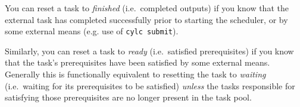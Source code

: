 You can reset a task to {\em finished} (i.e.\ completed outputs) if you
know that the external task has completed successfully prior to starting
the scheduler, or by some external means 
(e.g. use of \lstinline=cylc submit=).

Similarly, you can reset a task to {\em ready} (i.e.\ satisfied
prerequisites) if you know that the task's prerequisites have been
satisfied by some external means.  Generally this is functionally
equivalent to resetting the task to {\em waiting} (i.e.\ waiting for its
prerequisites to be satisfied) {\em unless} the tasks responsible for
satisfying those prerequisites are no longer present in the task pool.
